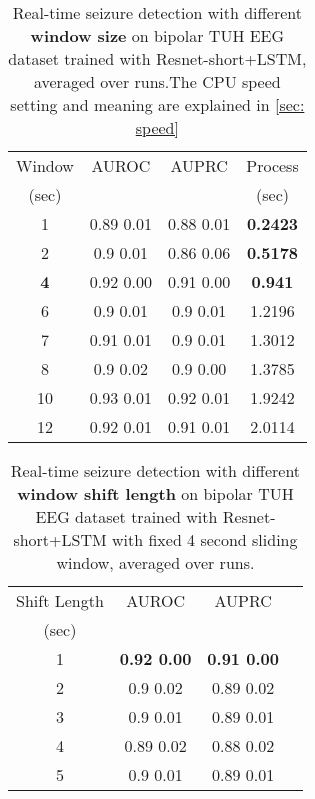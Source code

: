 \documentclass[pmlr,twocolumn,10pt]{jmlr}
\begin{document}
\begin{table}[h!]
    \small
	\centering
	\caption{Real-time seizure detection with different \textbf{window size} on bipolar TUH EEG dataset trained with Resnet-short+LSTM, averaged over  runs.The CPU speed setting and meaning are explained in \ref{sec: speed}}
	\label{windowsize_resnetlstm}
	\begin{tabular}{c|ccc}
		\toprule
		Window & AUROC & AUPRC & Process\\
		(sec) &&& (sec)\\
		\midrule
		1 & 0.89  0.01 & 0.88  0.01 & \textbf{0.2423} \\
		2  & 0.9  0.01 & 0.86  0.06 & \textbf{0.5178} \\
		\textbf{4} & 0.92  0.00 & 0.91  0.00 & \textbf{0.941}\\
		6  & 0.9  0.01 & 0.9  0.01 & 1.2196 \\
		7  & 0.91  0.01 & 0.9  0.01 & 1.3012 \\
		8  & 0.9  0.02 & 0.9  0.00 & 1.3785 \\
		10  & 0.93  0.01 & 0.92  0.01 & 1.9242 \\
		12  & 0.92  0.01 & 0.91  0.01  & 2.0114 \\
		\bottomrule
	\end{tabular}
\end{table} \begin{table}[h!]
	\small
	\centering
	\caption{Real-time seizure detection with different \textbf{window shift length} on bipolar TUH EEG dataset trained with Resnet-short+LSTM with fixed 4 second sliding window, averaged over  runs.}
	\label{shift_resnetlstm}
	\begin{tabular}{c|ccc}\toprule
		Shift Length & AUROC & AUPRC \\
		(sec)\\
		\midrule
		1 & \textbf{0.92  0.00} & \textbf{0.91  0.00}\\
		2 & 0.9  0.02 & 0.89  0.02\\ 
		3 & 0.9  0.01 & 0.89  0.01\\
		4 & 0.89  0.02 & 0.88  0.02\\
		5 & 0.9  0.01 & 0.89  0.01\\
		\bottomrule
	\end{tabular}
\end{table}
\end{document}
